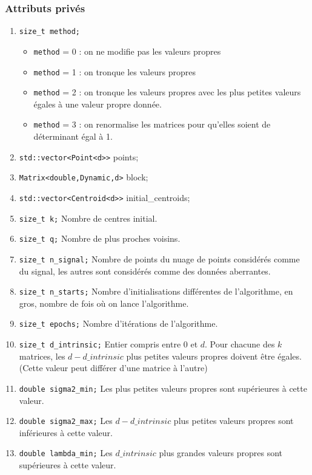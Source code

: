 \documentclass[10pt,a4paper,notitlepage]{article}
\begin{document}
\subsubsection{Attributs privés}
\begin{enumerate}
\item \texttt{size\_t method;}
\begin{itemize}
\item \texttt{method} = 0 : on ne modifie pas les valeurs propres
\item \texttt{method} = 1 : on tronque les valeurs propres 
\item \texttt{method} = 2 : on tronque les valeurs propres avec les plus petites valeurs égales à une valeur propre donnée.
\item \texttt{method} = 3 : on renormalise les matrices pour qu'elles soient de déterminant égal à 1.
\end{itemize}
\item \texttt{std::vector<Point<d>>} points;
\item \texttt{Matrix<double,Dynamic,d>} block; 
\item \texttt{std::vector<Centroid<d>>} initial\_centroids;
\item \texttt{size\_t k;} Nombre de centres initial.
\item \texttt{size\_t q;} Nombre de plus proches voisins.
\item \texttt{size\_t n\_signal;} Nombre de points du nuage de points considérés comme du signal, les autres sont considérés comme des données aberrantes. 
\item \texttt{size\_t n\_starts;} Nombre d'initialisations différentes de l'algorithme, en gros, nombre de fois où on lance l'algorithme.
\item \texttt{size\_t epochs;} Nombre d'itérations de l'algorithme.
\item \texttt{size\_t d\_intrinsic;} Entier compris entre 0 et $d$. Pour chacune des $k$ matrices, les $d-d\_intrinsic$ plus petites valeurs propres doivent être égales. (Cette valeur peut différer d'une matrice à l'autre)
\item \texttt{double sigma2\_min;} Les plus petites valeurs propres sont supérieures à cette valeur.
\item \texttt{double sigma2\_max;} Les $d-d\_intrinsic$ plus petites valeurs propres sont inférieures à cette valeur.
\item \texttt{double lambda\_min;} Les $d\_intrinsic$ plus grandes valeurs propres sont supérieures à cette valeur.

\end{enumerate}
\end{document}
